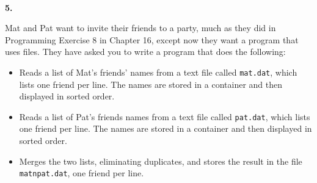 \documentclass[10 pt]{amsart}
\newlength{\cwidth}
\newenvironment{cpart}[2][\cwidth]
	{%
		\\ %
		\textbf{#2. }%
		\begin{minipage}[t]{#1}%
		\setlength{\parindent}{0pt}%
		\setlength{\parskip}{2ex}%
	}
	{%
		\end{minipage}%
	}
\newcommand{\ttt}[1]{\texttt{#1}}
\begin{document}
	\begin{cpart}{5}
		Mat and Pat want to invite their friends to a party, much as
		they did in Programming Exercise 8 in Chapter 16, except now they
		want a program that uses files.
		They have asked you to write a program that does the following:
		\begin{itemize}
			\item
				Reads a list of Mat's friends' names from a text file 
				called \ttt{mat.dat}, which lists one friend per line.
				The names are stored in a container and then displayed
				in sorted order.
			\item
				Reads a list of Pat's friends names from a text file called
				\ttt{pat.dat}, which lists one friend per line.
				The names are stored in a container and then displayed 
				in sorted order.
			\item
				Merges the two lists, eliminating duplicates, and stores
				the result in the file \ttt{matnpat.dat}, one friend
				per line.
		\end{itemize}
	\end{cpart}
\end{document}
